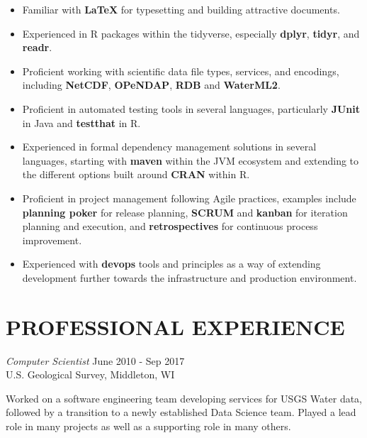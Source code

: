 \documentclass[line,margin]{res}
\begin{document}
\begin{resume}
\begin{itemize}
	\item Familiar with \textbf{\LaTeX} for typesetting and building attractive documents.
	\item Experienced in R packages within the tidyverse, especially \textbf{dplyr}, \textbf{tidyr}, and \textbf{readr}.
	\item Proficient working with scientific data file types, services, and encodings, including \textbf{NetCDF}, \textbf{OPeNDAP}, \textbf{RDB} and \textbf{WaterML2}.
	\item Proficient in automated testing tools in several languages, particularly \textbf{JUnit} in Java and \textbf{testthat} in R.
	\item Experienced in formal dependency management solutions in several languages, starting with \textbf{maven} within the JVM ecosystem and extending to the different options built around \textbf{CRAN} within R.
	\item Proficient in project management following Agile practices, examples include \textbf{planning poker} for release planning, \textbf{SCRUM} and \textbf{kanban} for iteration planning and execution, and \textbf{retrospectives} for continuous process improvement.
	\item Experienced with \textbf{devops} tools and principles as a way of extending development further towards the infrastructure and production environment.
\end{itemize}
 
\section{PROFESSIONAL EXPERIENCE}
		{\sl Computer Scientist} \hfill June 2010 - Sep 2017 \\
		U.S. Geological Survey, Middleton, WI

		Worked on a software engineering team developing services for USGS Water data, followed by a transition to a newly established Data Science team.  Played a lead role in many projects as well as a supporting role in many others. 


\end{resume}
\end{document}

